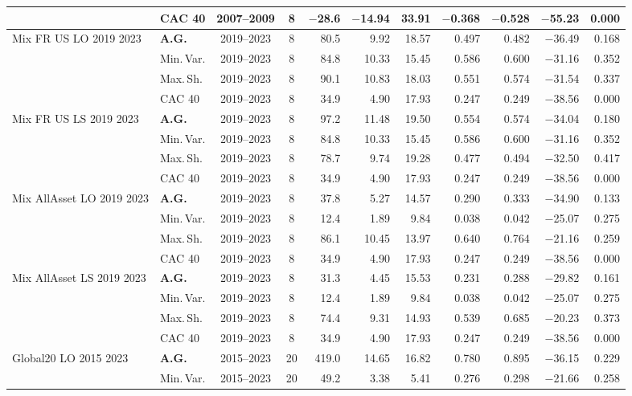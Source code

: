 \begin{longtable}{p{2.6cm} l c c r r r r r r r}
 & CAC 40 & 2007--2009 & 8 & $-$28.6 & $-$14.94 & 33.91 & $-$0.368 & $-$0.528 & $-$55.23 & 0.000 \\
\midrule
Mix FR US LO 2019 2023 & \textbf{A.G.} & 2019--2023 & 8 & 80.5 & 9.92 & 18.57 & 0.497 & 0.482 & $-$36.49 & 0.168 \\
 & Min.\,Var. & 2019--2023 & 8 & 84.8 & 10.33 & 15.45 & 0.586 & 0.600 & $-$31.16 & 0.352 \\
 & Max.\,Sh. & 2019--2023 & 8 & 90.1 & 10.83 & 18.03 & 0.551 & 0.574 & $-$31.54 & 0.337 \\
 & CAC 40 & 2019--2023 & 8 & 34.9 & 4.90 & 17.93 & 0.247 & 0.249 & $-$38.56 & 0.000 \\
\midrule
Mix FR US LS 2019 2023 & \textbf{A.G.} & 2019--2023 & 8 & 97.2 & 11.48 & 19.50 & 0.554 & 0.574 & $-$34.04 & 0.180 \\
 & Min.\,Var. & 2019--2023 & 8 & 84.8 & 10.33 & 15.45 & 0.586 & 0.600 & $-$31.16 & 0.352 \\
 & Max.\,Sh. & 2019--2023 & 8 & 78.7 & 9.74 & 19.28 & 0.477 & 0.494 & $-$32.50 & 0.417 \\
 & CAC 40 & 2019--2023 & 8 & 34.9 & 4.90 & 17.93 & 0.247 & 0.249 & $-$38.56 & 0.000 \\
\midrule
Mix AllAsset LO 2019 2023 & \textbf{A.G.} & 2019--2023 & 8 & 37.8 & 5.27 & 14.57 & 0.290 & 0.333 & $-$34.90 & 0.133 \\
 & Min.\,Var. & 2019--2023 & 8 & 12.4 & 1.89 & 9.84 & 0.038 & 0.042 & $-$25.07 & 0.275 \\
 & Max.\,Sh. & 2019--2023 & 8 & 86.1 & 10.45 & 13.97 & 0.640 & 0.764 & $-$21.16 & 0.259 \\
 & CAC 40 & 2019--2023 & 8 & 34.9 & 4.90 & 17.93 & 0.247 & 0.249 & $-$38.56 & 0.000 \\
\midrule
Mix AllAsset LS 2019 2023 & \textbf{A.G.} & 2019--2023 & 8 & 31.3 & 4.45 & 15.53 & 0.231 & 0.288 & $-$29.82 & 0.161 \\
 & Min.\,Var. & 2019--2023 & 8 & 12.4 & 1.89 & 9.84 & 0.038 & 0.042 & $-$25.07 & 0.275 \\
 & Max.\,Sh. & 2019--2023 & 8 & 74.4 & 9.31 & 14.93 & 0.539 & 0.685 & $-$20.23 & 0.373 \\
 & CAC 40 & 2019--2023 & 8 & 34.9 & 4.90 & 17.93 & 0.247 & 0.249 & $-$38.56 & 0.000 \\
\midrule
Global20 LO 2015 2023 & \textbf{A.G.} & 2015--2023 & 20 & 419.0 & 14.65 & 16.82 & 0.780 & 0.895 & $-$36.15 & 0.229 \\
 & Min.\,Var. & 2015--2023 & 20 & 49.2 & 3.38 & 5.41 & 0.276 & 0.298 & $-$21.66 & 0.258 \\

\end{longtable}
